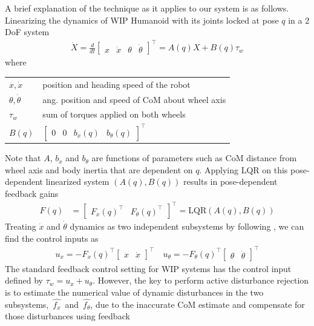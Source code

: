 \documentclass[letterpaper, 10 pt, conference]{ieeeconf}
\makeatletter
\newenvironment{conditions}
  {\par\vspace{\abovedisplayskip}\noindent\begin{tabular}{>{$}l<{$} @{${}={}$}
  l}}
  {\end{tabular}\par\vspace{\belowdisplayskip}}
\makeatother
\begin{document}
A brief explanation of the technique as it applies to our system is as follows.
Linearizing the dynamics of WIP Humanoid with its joints locked at pose $q$ in a
2 \ac{DoF} system
\begin{align}
    \dot{X} = \frac{d}{dt} \begin{bmatrix} x & \dot{x} & \theta & \dot\theta
    \end{bmatrix}^\top = A(q)X + B(q)\tau_w
\end{align}
where
\begin{conditions}
x, \dot{x} & position and heading speed of the robot \\
\theta, \dot\theta & ang. position and speed of CoM about wheel axis \\
\tau_w & sum of torques applied on both wheels \\
B(q) & $\begin{bmatrix} 0 & 0 & b_x(q) & b_{\theta}(q) \end{bmatrix}^\top$
\end{conditions}
Note that $A$, $b_x$ and $b_{\theta}$ are functions of parameters such as
\ac{CoM} distance from wheel axis and body inertia that are dependent on $q$.
Applying LQR on this pose-dependent linearized system $(A(q), B(q))$ results in
pose-dependent feedback gains
\begin{align}
    F(q) &= \begin{bmatrix} F_x(q)^\top & F_\theta(q)^\top \end{bmatrix}^\top =
    \mbox{LQR}(A(q), B(q))
\end{align}
Treating $\dot{x}$ and $\dot{\theta}$ dynamics as two independent subsystems by
following \cite{miklosovic2005dynamic}, we can find the control inputs as
\begin{align}
    u_x = -F_x(q)^\top \begin{bmatrix} x & \dot{x} \end{bmatrix}^\top \quad
    u_\theta = -F_\theta(q)^\top \begin{bmatrix} \theta & \dot{\theta}
    \end{bmatrix}^\top\nonumber
\end{align}
The standard feedback control setting for \ac{WIP} systems has the control input
defined by $\tau_w = u_x + u_{\theta}$. However, the key to perform active
disturbance rejection is to estimate the numerical value of dynamic disturbances
in the two subsystems,~$\hat{f_x}$~and~$\hat{f_{\theta}}$, due to the inaccurate
\ac{CoM} estimate and compensate for those disturbances using feedback
\end{document}
